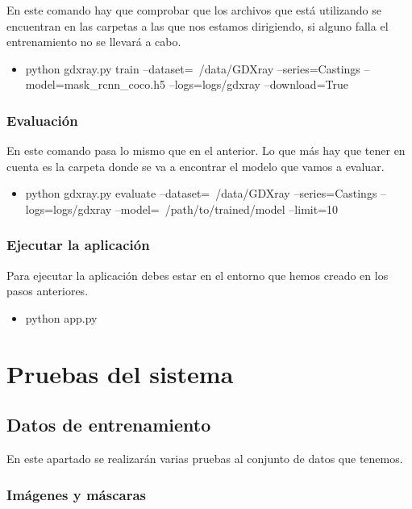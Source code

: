 En este comando hay que comprobar que los archivos que está utilizando se encuentran en las carpetas a las que nos estamos dirigiendo, si alguno falla el entrenamiento no se llevará a cabo.

\begin{itemize}
    \tightlist
    \item python gdxray.py train --dataset=~/data/GDXray --series=Castings --model=mask\_rcnn\_coco.h5 --logs=logs/gdxray --download=True
\end{itemize}

\subsubsection{Evaluación}

En este comando pasa lo mismo que en el anterior. Lo que más hay que tener en cuenta es la carpeta donde se va a encontrar el modelo que vamos a evaluar.

\begin{itemize}
    \tightlist
    \item python gdxray.py evaluate --dataset=~/data/GDXray --series=Castings --logs=logs/gdxray --model=~/path/to/trained/model --limit=10
\end{itemize}

\subsubsection{Ejecutar la aplicación}

Para ejecutar la aplicación debes estar en el entorno que hemos creado en los pasos anteriores.

\begin{itemize}
    \tightlist
    \item python app.py
\end{itemize}

\section{Pruebas del sistema}

\subsection{Datos de entrenamiento}

En este apartado se realizarán varias pruebas al conjunto de datos que tenemos.

\newpage

\subsubsection{Imágenes y máscaras}

